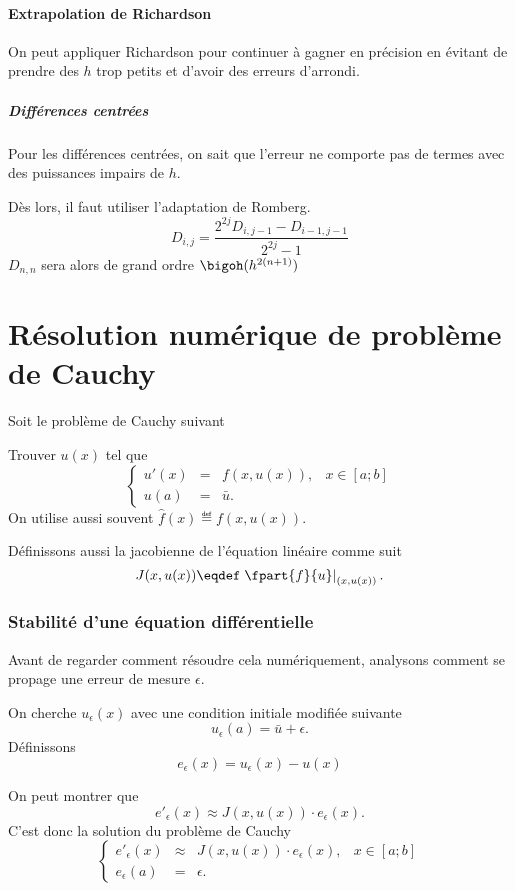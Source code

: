 \subsection{Extrapolation de Richardson}
On peut appliquer Richardson pour continuer à gagner en précision
en évitant de prendre des $h$ trop petits et d'avoir des erreurs d'arrondi.

\subsubsection{Différences centrées}
Pour les différences centrées, on sait que l'erreur ne comporte
pas de termes avec des puissances impairs de $h$.

Dès lors, il faut utiliser l'adaptation de Romberg.
\[ D_{i, j} = \frac{2^{2j}D_{i,j-1} - D_{i-1,j-1}}{2^{2j}-1} \]
$D_{n, n}$ sera alors de grand ordre $\bigoh(h^{2(n+1)})$

\part{Résolution numérique de problème de Cauchy}
Soit le problème de Cauchy suivant

Trouver $u(x)$ tel que
\[ \left\{ \begin{array}{rclr}
    u'(x) & = & f(x,u(x)), & x \in [a;b]\\
    u(a) & = & \bar{u}.
\end{array} \right. \]
On utilise aussi souvent $\hat{f}(x) \eqdef f(x, u(x))$.

Définissons aussi la jacobienne de l'équation linéaire comme suit
\[ J(x, u(x)) \eqdef \left.\fpart{f}{u}\right|_{(x,u(x))}. \]

\section{Stabilité d'une équation différentielle}
Avant de regarder comment résoudre cela numériquement,
analysons comment se propage une erreur de mesure $\epsilon$.

On cherche $u_\epsilon(x)$ avec une condition initiale modifiée suivante
\[ u_\epsilon(a) = \bar{u} + \epsilon. \]
Définissons
\[ e_\epsilon(x) = u_\epsilon(x) - u(x) \]

On peut montrer que
\[ e'_\epsilon(x) \approx J(x, u(x))\cdot e_\epsilon(x). \]
C'est donc la solution du problème de Cauchy
\[ \left\{ \begin{array}{rclr}
    e'_\epsilon(x) & \approx & J(x, u(x)) \cdot e_\epsilon(x), & x \in [a;b]\\
    e_\epsilon(a) & = & \epsilon.
\end{array} \right. \]

